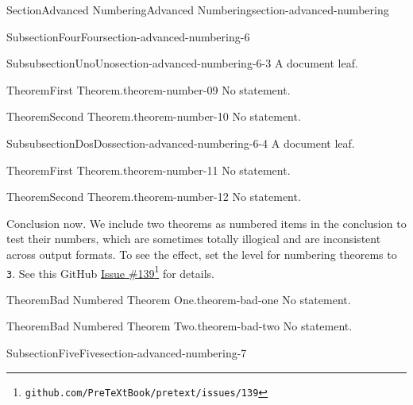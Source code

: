 \documentclass[twoside,10pt,]{article}
\newcommand{\mono}[1]{\texttt{#1}}
\numberwithin{equation}{section}
\begin{document}
\begin{sectionptx}{Section}{Advanced Numbering}{}{Advanced Numbering}{}{}{section-advanced-numbering}
\begin{subsectionptx}{Subsection}{Four}{}{Four}{}{}{section-advanced-numbering-6}
\typeout{************************************************}
%
\begin{subsubsectionptx}{Subsubsection}{Uno}{}{Uno}{}{}{section-advanced-numbering-6-3}
A document leaf.%
\begin{theorem}{Theorem}{First Theorem.}{}{theorem-number-09}%
No statement.%
\end{theorem}
\begin{theorem}{Theorem}{Second Theorem.}{}{theorem-number-10}%
No statement.%
\end{theorem}
\end{subsubsectionptx}
%
%
\typeout{************************************************}
\typeout{************************************************}
%
\begin{subsubsectionptx}{Subsubsection}{Dos}{}{Dos}{}{}{section-advanced-numbering-6-4}
A document leaf.%
\begin{theorem}{Theorem}{First Theorem.}{}{theorem-number-11}%
No statement.%
\end{theorem}
\begin{theorem}{Theorem}{Second Theorem.}{}{theorem-number-12}%
No statement.%
\end{theorem}
\end{subsubsectionptx}
\begin{conclusion}{}%
Conclusion now.  We include two theorems as numbered items in the conclusion to test their numbers, which are sometimes totally illogical and are inconsistent across output formats.  To see the effect, set the level for numbering theorems to \mono{3}.  See this GitHub \href{https://github.com/PreTeXtBook/pretext/issues/139}{Issue \#139}\footnote{\nolinkurl{github.com/PreTeXtBook/pretext/issues/139}\label{section-advanced-numbering-6-5-1-3}} for details.%
\begin{theorem}{Theorem}{Bad Numbered Theorem One.}{}{theorem-bad-one}%
No statement.%
\end{theorem}
\begin{theorem}{Theorem}{Bad Numbered Theorem Two.}{}{theorem-bad-two}%
No statement.%
\end{theorem}
\end{conclusion}%
\end{subsectionptx}
%
%
\typeout{************************************************}
\typeout{************************************************}
%
\begin{subsectionptx}{Subsection}{Five}{}{Five}{}{}{section-advanced-numbering-7}

\end{subsectionptx}
\end{sectionptx}
\end{document}
